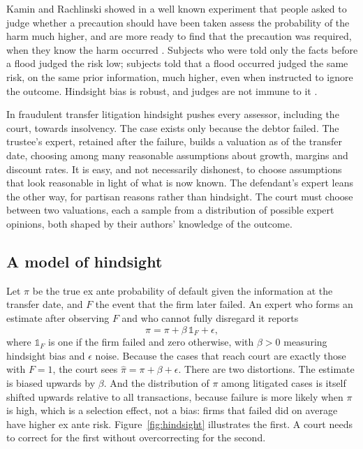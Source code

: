 Kamin and Rachlinski showed in a well known experiment that people asked to judge whether a precaution should have been taken assess the probability of the harm much higher, and are more ready to find that the precaution was required, when they know the harm occurred \citep{kamin1995}. Subjects who were told only the facts before a flood judged the risk low; subjects told that a flood occurred judged the same risk, on the same prior information, much higher, even when instructed to ignore the outcome. Hindsight bias is robust, and judges are not immune to it \citep{guthrie2001}.

In fraudulent transfer litigation hindsight pushes every assessor, including the court, towards insolvency. The case exists only because the debtor failed. The trustee's expert, retained after the failure, builds a valuation as of the transfer date, choosing among many reasonable assumptions about growth, margins and discount rates. It is easy, and not necessarily dishonest, to choose assumptions that look reasonable in light of what is now known. The defendant's expert leans the other way, for partisan reasons rather than hindsight. The court must choose between two valuations, each a sample from a distribution of possible expert opinions, both shaped by their authors' knowledge of the outcome.

\subsection{A model of hindsight}

Let $\pi$ be the true ex ante probability of default given the information at the transfer date, and $F$ the event that the firm later failed. An expert who forms an estimate after observing $F$ and who cannot fully disregard it reports
\begin{equation}
\hat\pi = \pi + \beta\,\mathbb{1}_F + \epsilon,
\end{equation}
where $\mathbb{1}_F$ is one if the firm failed and zero otherwise, with $\beta > 0$ measuring hindsight bias and $\epsilon$ noise. Because the cases that reach court are exactly those with $F = 1$, the court sees $\hat\pi = \pi + \beta + \epsilon$. There are two distortions. The estimate is biased upwards by $\beta$. And the distribution of $\pi$ among litigated cases is itself shifted upwards relative to all transactions, because failure is more likely when $\pi$ is high, which is a selection effect, not a bias: firms that failed did on average have higher ex ante risk. Figure~\ref{fig:hindsight} illustrates the first. A court needs to correct for the first without overcorrecting for the second.

